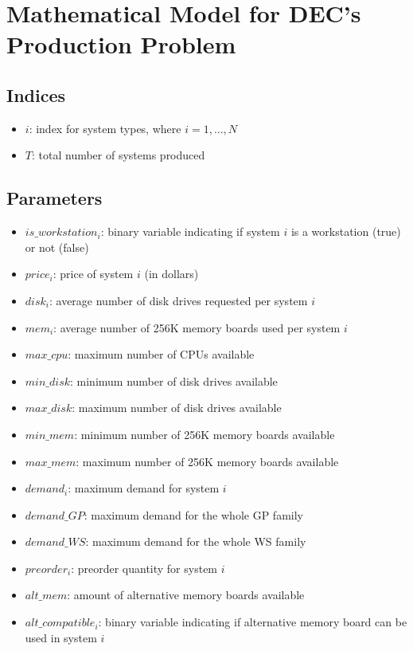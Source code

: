 \documentclass{article}
\begin{document}
\section*{Mathematical Model for DEC's Production Problem}

\subsection*{Indices}
\begin{itemize}
    \item $i$: index for system types, where $i = 1, \ldots, N$
    \item $T$: total number of systems produced
\end{itemize}

\subsection*{Parameters}
\begin{itemize}
    \item $is\_workstation_i$: binary variable indicating if system $i$ is a workstation (true) or not (false)
    \item $price_i$: price of system $i$ (in dollars)
    \item $disk_i$: average number of disk drives requested per system $i$
    \item $mem_i$: average number of 256K memory boards used per system $i$
    \item $max\_cpu$: maximum number of CPUs available
    \item $min\_disk$: minimum number of disk drives available
    \item $max\_disk$: maximum number of disk drives available
    \item $min\_mem$: minimum number of 256K memory boards available
    \item $max\_mem$: maximum number of 256K memory boards available
    \item $demand_i$: maximum demand for system $i$
    \item $demand\_GP$: maximum demand for the whole GP family
    \item $demand\_WS$: maximum demand for the whole WS family
    \item $preorder_i$: preorder quantity for system $i$
    \item $alt\_mem$: amount of alternative memory boards available
    \item $alt\_compatible_i$: binary variable indicating if alternative memory board can be used in system $i$
\end{itemize}
\end{document}
